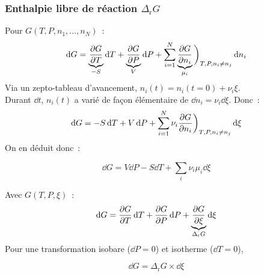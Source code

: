 \documentclass{article}
\newcommand{\Dr}{\Delta_{\mathrm{r}}}
\begin{document}
\subsubsection{Enthalpie libre de réaction $\Dr G$}
\begin{tableau}
    Pour $G(T,P,n_1,\dots,n_N)$~:
    \begin{equation*}
        \dd{G} = \underbrace{\pdv{G}{T}}_{-S}\dd{T} + \underbrace{\pdv{G}{P}}_{V}\dd{P} + \sum_{i=1}^N \underbrace{\pdv{G}{n_i}}_{\mu_i}\bigg)_{T,P,n_i\neq n_j}\dd{n_i}
    \end{equation*}
    Via un zepto-tableau d'avancement, $n_i(t) = n_i(t=0) + \nu_i \xi$.\\
    Durant $\dd{t}$, $n_i(t)$ a varié de façon élémentaire de $\dd{n_i} = \nu_i\dd{\xi}$. Donc~:
    $$\dd{G} = -S\dd{T} + V\dd{P} + \sum_{i=1}^N \nu_i\pdv{G}{n_i}\bigg)_{T,P,n_i\neq n_j}\dd{\xi}$$
    On en déduit donc~:
    \begin{enonce}
    \begin{equation}\label{id4}
        \dd{G} = V\dd{P} - S\dd{T} + \sum_i \nu_i\mu_i\dd{\xi}
    \end{equation}
    \end{enonce}
    \tcbline
    Avec $G(T,P,\xi)$~:
    \begin{equation*}
        \dd{G} = \pdv{G}{T}\dd{T} + \pdv{G}{P}\dd{P} + \underbrace{\pdv{G}{\xi}}_{\Dr G}\dd{\xi}
    \end{equation*}
    Pour une transformation isobare ($\dd{P}= 0$) et isotherme ($\dd{T} =0$),
    \begin{enonce}
        \begin{equation}\label{troputile}
            \dd{G} = \Dr G\times \dd{\xi}
        \end{equation}
    \end{enonce}
\end{tableau}
\end{document}
